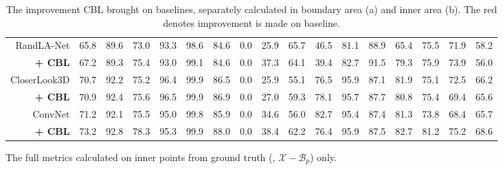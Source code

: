 \documentclass[10pt,twocolumn,letterpaper]{article}
\begin{document}
\begin{table*}
\begin{subtable}{\linewidth}
\begin{center}
{\begin{tabular}{r |c c c | c c c c c c c c c c c c c}
    \hline
    RandLA-Net\cite{randlanet}     & 65.8 & 89.6 & 73.0 & 93.3 & 98.6 & 84.6 & 0.0 & 25.9 & 65.7 & 46.5 & 81.1 & 88.9 & 65.4 & 75.5 & 71.9 & 58.2 \\
    \textbf{+ CBL}                 & {\color{red}67.2} & 89.3 & {\color{red}75.4} & 93.0 & 99.1 & 84.6 & 0.0 & {\color{red}37.3} & 64.1 & 39.4 & {\color{red}82.7} & {\color{red}91.5} & {\color{red}79.3} & {\color{red}75.9} & {\color{red}73.9} & 56.0 \\


    \hline
    CloserLook3D\cite{closerlook}  & 70.7 & 92.2 & 75.2 & 96.4 & 99.9 & 86.5 & 0.0 & 25.9 & 55.1 & 76.5 & 95.9 & 87.1 & 81.9 & 75.1 & 72.5 & 66.2 \\
    \textbf{+ CBL}                 & {\color{red}70.9} & {\color{red}92.4} & {\color{red}75.6} & {\color{red}96.5} & 99.9 & {\color{red}86.9} & 0.0 & {\color{red}27.0} & {\color{red}59.3} & {\color{red}78.1} & 95.7 & {\color{red}87.7} & 80.8 & {\color{red}75.4} & 69.4 & 65.6 \\


    \hline
    ConvNet                        & 71.2 & 92.1 & 75.5 & 95.0 & 99.8 & 85.9 & 0.0 & 34.6 & 56.0 & 82.7 & 95.4 & 87.4 & 81.3 & 73.8 & 68.4 & 65.7 \\
    \textbf{+ CBL}                 & {\color{red}73.2} & {\color{red}92.8} & {\color{red}78.3} & {\color{red}95.3} & {\color{red}99.9} & {\color{red}88.0} & 0.0 & {\color{red}38.4} & {\color{red}62.2} & 76.4 & {\color{red}95.9} & {\color{red}87.5} & {\color{red}82.7} & {\color{red}81.2} & {\color{red}75.2} & {\color{red}68.6} \\


    \hline
    \end{tabular}
    }\end{center}
    \caption{
    The full metrics calculated on inner points from ground truth (\ie, $\mathcal X - \mathcal B_p$) only.
    }
    \label{tbl:inner_iou_l}
\end{subtable}

\caption{The improvement CBL brought on baselines, separately calculated in boundary area (a) and inner area (b). The {\color{red} red} denotes improvement is made on baseline.}
\label{tbl:bound_inner_iou}

\end{table*}
\end{document}
